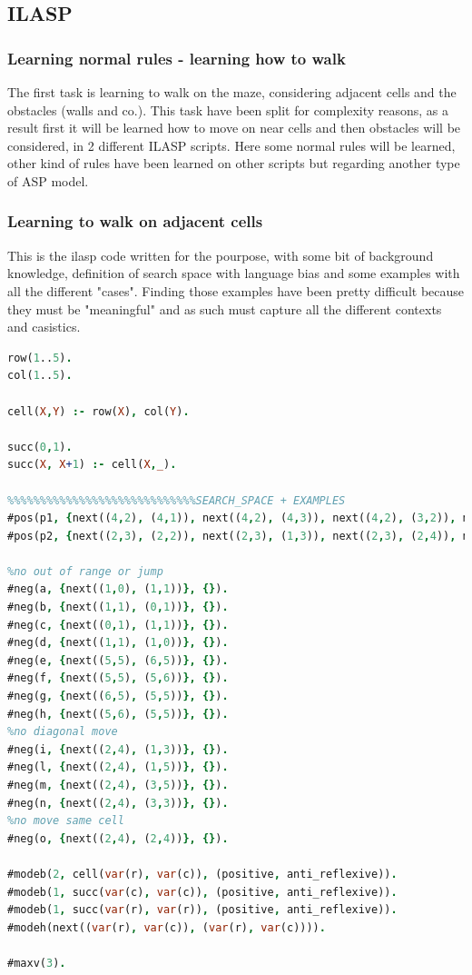 \subsection{ILASP}\label{sec:ilasp}

\subsubsection{Learning normal rules - learning how to walk}

The first task is learning to walk on the maze, considering adjacent cells and the obstacles (walls and co.). This task have been split for complexity reasons, as a result first it will be learned how to move on near cells and then obstacles will be considered, in 2 different ILASP scripts. Here some normal rules will be learned, other kind of rules have been learned on other scripts but regarding another type of ASP model. 

\subsubsection{Learning to walk on adjacent cells}

This is the ilasp code written for the pourpose, with some bit of background knowledge, definition of search space with language bias and some examples with all the different "cases".  Finding those examples have been pretty difficult because they must be "meaningful" and as such must capture all the different contexts and casistics.

\newpage
\begin{lstlisting}[language=Prolog]
%%%%%%%%%%%%%%%%%%%%%%%%learn how to move on near cells
row(1..5).
col(1..5).

cell(X,Y) :- row(X), col(Y).

succ(0,1).
succ(X, X+1) :- cell(X,_).

%%%%%%%%%%%%%%%%%%%%%%%%%%%%%SEARCH_SPACE + EXAMPLES
#pos(p1, {next((4,2), (4,1)), next((4,2), (4,3)), next((4,2), (3,2)), next((4,2), (5,2))}, {}).
#pos(p2, {next((2,3), (2,2)), next((2,3), (1,3)), next((2,3), (2,4)), next((2,3), (3,3))}, {}).

%no out of range or jump
#neg(a, {next((1,0), (1,1))}, {}).
#neg(b, {next((1,1), (0,1))}, {}).
#neg(c, {next((0,1), (1,1))}, {}).
#neg(d, {next((1,1), (1,0))}, {}).
#neg(e, {next((5,5), (6,5))}, {}).
#neg(f, {next((5,5), (5,6))}, {}).
#neg(g, {next((6,5), (5,5))}, {}).
#neg(h, {next((5,6), (5,5))}, {}).
%no diagonal move
#neg(i, {next((2,4), (1,3))}, {}).
#neg(l, {next((2,4), (1,5))}, {}).
#neg(m, {next((2,4), (3,5))}, {}).
#neg(n, {next((2,4), (3,3))}, {}).
%no move same cell
#neg(o, {next((2,4), (2,4))}, {}).

#modeb(2, cell(var(r), var(c)), (positive, anti_reflexive)).
#modeb(1, succ(var(c), var(c)), (positive, anti_reflexive)).
#modeb(1, succ(var(r), var(r)), (positive, anti_reflexive)).
#modeh(next((var(r), var(c)), (var(r), var(c)))).

#maxv(3).
\end{lstlisting}

